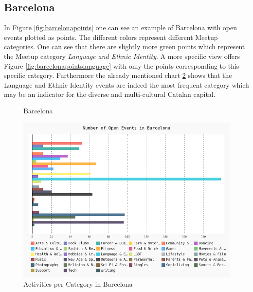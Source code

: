 \subsection*{Barcelona}

In Figure \ref{fig:barcelonapoints} one can see an example of Barcelona with open events plotted as points. The different colors represent different Meetup categories. One can see that there are slightly more green points which represent the Meetup category \emph{Language and Ethnic Identity}. A more specific view offers Figure \ref{fig:barcelonapointslanguage} with only the points corresponding to this specific category. Furthermore the already mentioned chart \ref{fig:barcelonabar} shows that the Language and Ethnic Identity events are indeed the most frequent category which may be an indicator for the diverse and multi-cultural Catalan capital. 

\begin{figure}[!b]
	\hfill
	\caption{Barcelona}\label{fig:barcelonamap}
\end{figure}

\begin{figure}[!b]
	\includegraphics[width=1\linewidth]{../plotting/pngs/categories/Barcelona.png}
	\caption{Activities per Category in Barcelona}\label{fig:barcelonabar}	
\end{figure}

